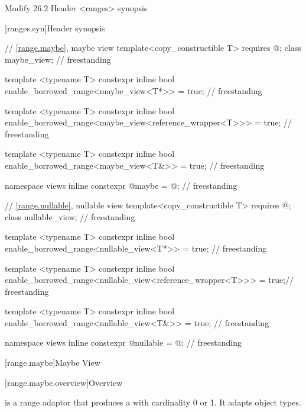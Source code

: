 \documentclass[a4paper,10pt,oneside,openany,final,article]{memoir}
\begin{document}
\begin{wording}


Modify 26.2 Header <ranges> synopsis

[ranges.syn]{Header  synopsis}

\begin{adjustwidth}{1cm}{1cm}
  \begin{addedblock}
    \begin{codeblock}
// \ref{range.maybe}, maybe view
template<copy_constructible T>
requires @\seebelow@;
class maybe_view;                                              // freestanding

template <typename T>
constexpr inline bool
enable_borrowed_range<maybe_view<T*>> = true;                  // freestanding

template <typename T>
constexpr inline bool
enable_borrowed_range<maybe_view<reference_wrapper<T>>> = true; // freestanding

template <typename T>
constexpr inline bool
enable_borrowed_range<maybe_view<T&>> = true;                  // freestanding

namespace views {
  inline constexpr @\unspec@ maybe = @\unspec@;           // freestanding
}

// \ref{range.nullable}, nullable view
template<copy_constructible T>
requires @\seebelow@;
class nullable_view;                                           // freestanding

template <typename T>
constexpr inline bool
enable_borrowed_range<nullable_view<T*>> = true;               // freestanding

template <typename T>
constexpr inline bool
enable_borrowed_range<nullable_view<reference_wrapper<T>>> = true;// freestanding

template <typename T>
constexpr inline bool
enable_borrowed_range<nullable_view<T&>> = true;                // freestanding

namespace views {
  inline constexpr @\unspec@ nullable = @\unspec@;        // freestanding
}



    \end{codeblock}
  \end{addedblock}
\end{adjustwidth}

[range.maybe]{Maybe View}

[range.maybe.overview]{Overview}

\pnum
{} is a range adaptor that produces a  with cardinality 0 or 1. It adapts  object types.



\end{wording}
\end{document}
